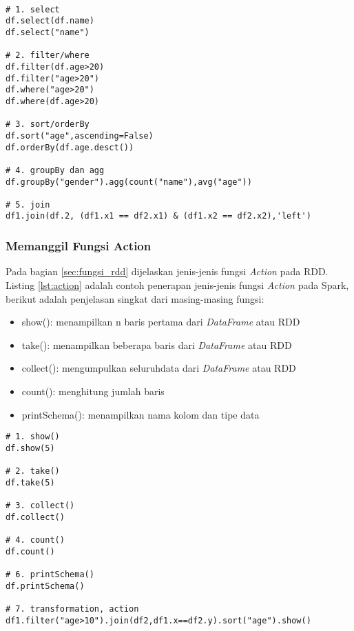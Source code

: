 \begin{lstlisting}[basicstyle=\ttfamily, frame=single,
	columns=fullflexible, keepspaces=true, breaklines=true, label=lst:transformation, caption=Contoh Fungsi Transformation]
	
# 1. select
df.select(df.name)
df.select("name")

# 2. filter/where
df.filter(df.age>20)
df.filter("age>20")
df.where("age>20")
df.where(df.age>20)
 
# 3. sort/orderBy 
df.sort("age",ascending=False)
df.orderBy(df.age.desct())
 
# 4. groupBy dan agg
df.groupBy("gender").agg(count("name"),avg("age"))

# 5. join
df1.join(df.2, (df1.x1 == df2.x1) & (df1.x2 == df2.x2),'left')

\end{lstlisting}

\subsubsection{Memanggil Fungsi Action}
\noindent Pada bagian \ref{sec:fungsi_rdd} dijelaskan jenis-jenis fungsi \textit{Action} pada RDD. Listing \ref{lst:action} adalah contoh penerapan jenis-jenis fungsi \textit{Action} pada Spark, berikut adalah penjelasan singkat dari masing-masing fungsi:
\begin{itemize}
\item show(): menampilkan n baris pertama dari \textit{DataFrame} atau RDD
\item take(): menampilkan beberapa baris dari \textit{DataFrame} atau RDD
\item collect(): mengumpulkan seluruhdata dari \textit{DataFrame} atau RDD 
\item count(): menghitung jumlah baris
\item printSchema(): menampilkan nama kolom dan tipe data
\end{itemize}

\begin{lstlisting}[basicstyle=\ttfamily, frame=single,
	columns=fullflexible, keepspaces=true, breaklines=true, label=lst:action, caption=Contoh Fungsi Action]
# 1. show()
df.show(5)

# 2. take()
df.take(5)

# 3. collect()
df.collect()

# 4. count()
df.count()

# 6. printSchema()
df.printSchema()

# 7. transformation, action
df1.filter("age>10").join(df2,df1.x==df2.y).sort("age").show()


\end{lstlisting}

